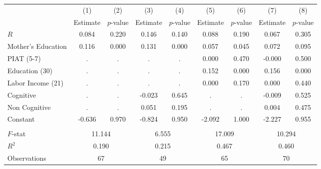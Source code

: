 \begin{tabular}{lcccccccc} \toprule
 & (1) & (2) & (3) & (4) & (5) & (6) & (7) & (8) \\ 
 & Estimate  & $p$-value  & Estimate  & $p$-value  & Estimate  & $p$-value  & Estimate  & $p$-value  \\  \midrule
$R$ &     0.084 &     0.220 &     0.146 &     0.140 &     0.088 &     0.190 &     0.067 &     0.305 \\  
Mother's Education &     0.116 &     0.000 &     0.131 &     0.000 &     0.057 &     0.045 &     0.072 &     0.095 \\  
PIAT (5-7) &         . &         . &         . &         . &     0.000 &     0.470 &    -0.000 &     0.500 \\  
Education (30) &         . &         . &         . &         . &     0.152 &     0.000 &     0.156 &     0.000 \\  
Labor Income (21) &         . &         . &         . &         . &     0.000 &     0.170 &     0.000 &     0.440 \\  
Cognitive &         . &         . &    -0.023 &     0.645 &         . &         . &    -0.009 &     0.525 \\  
Non Cognitive &         . &         . &     0.051 &     0.195 &         . &         . &     0.004 &     0.475 \\  
Constant &    -0.636 &     0.970 &    -0.824 &     0.950 &    -2.092 &     1.000 &    -2.227 &     0.955 \\  \\ \hline
$F$-stat &    \multicolumn{2}{c}{11.144} &          \multicolumn{2}{c}{6.555} &           \multicolumn{2}{c}{17.009} &    \multicolumn{2}{c}{10.294}  \\  
$R^2$ &     \multicolumn{2}{c}{0.190} &            \multicolumn{2}{c}{0.215} &           \multicolumn{2}{c}{0.467} &     \multicolumn{2}{c}{0.460}  \\  
Observations &    \multicolumn{2}{c}{67} &           \multicolumn{2}{c}{49} &           \multicolumn{2}{c}{65} &   \multicolumn{2}{c}{70} \\  
\bottomrule \end{tabular}
